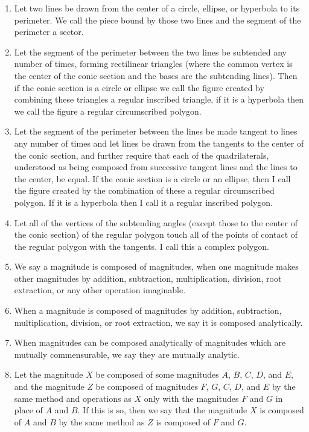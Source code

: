 \documentclass[11pt,letterpaper]{book}
\begin{document}
\begin{enumerate}
  \item Let two lines be drawn from the center of a circle, ellipse, or
  hyperbola to its perimeter. We call the piece bound by those two lines and
  the segment of the perimeter a sector.
  
  \item Let the segment of the perimeter between the two lines be subtended
  any number of times, forming rectilinear triangles (where the common vertex
  is the center of the conic section and the bases are the subtending lines).
  Then if the conic section is a circle or ellipse we call the figure created
  by combining these triangles a regular inscribed triangle, if it is a
  hyperbola then we call the figure a regular circumscribed polygon.
  
  \item Let the segment of the perimeter between the lines be made tangent to
  lines any number of times and let lines be drawn from the tangents to the
  center of the conic section, and further require that each of the
  quadrilaterals, understood as being composed from successive tangent lines
  and the lines to the center, be equal. If the conic section is a circle or an
  ellipse, then I call the figure created by the combination of these a regular
  circumscribed polygon. If it is a hyperbola then I call it a regular
  inscribed polygon.
  
  \item Let all of the vertices of the subtending angles (except those to the
  center of the conic section) of the regular polygon touch all of the points
  of contact of the regular polygon with the tangents. I call this a complex
  polygon.
  
  \item We say a magnitude is composed of magnitudes, when one magnitude
  makes other magnitudes by addition, subtraction, multiplication, division,
  root extraction, or any other operation imaginable.
  
  \item When a magnitude is composed of magnitudes by addition, subtraction,
  multiplication, division, or root extraction, we say it is composed
  analytically.
  
  \item When magnitudes can be composed analytically of magnitudes which are
  mutually commensurable, we say they are mutually analytic.
  
  \item Let the magnitude $X$ be composed of some magnitudes $A$, $B$, $C$, $D$,
  and $E$, and the magnitude $Z$ be composed of magnitudes $F$, $G$, $C$, $D$,
  and $E$ by the same method and operations as $X$ only with the magnitudes $F$
  and $G$ in place of $A$ and $B$. If this is so, then we say that the magnitude
  $X$ is composed of $A$ and $B$ by the same method as $Z$ is composed of $F$
  and $G$.
  

\end{enumerate}
\end{document}
